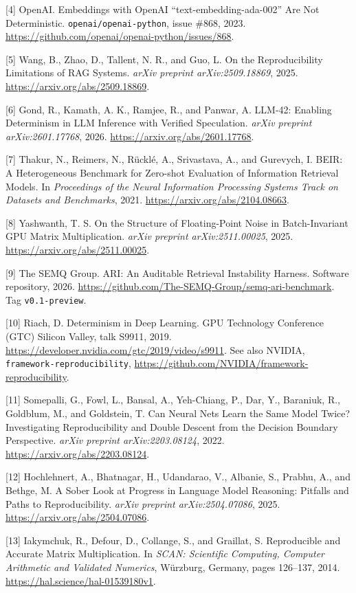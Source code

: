 \documentclass{article}
\begin{document}
[4] OpenAI.
Embeddings with OpenAI ``text-embedding-ada-002'' Are Not Deterministic.
\texttt{openai/openai-python}, issue \#868, 2023.
\url{https://github.com/openai/openai-python/issues/868}.

[5] Wang, B., Zhao, D., Tallent, N. R., and Guo, L.
On the Reproducibility Limitations of RAG Systems.
\emph{arXiv preprint arXiv:2509.18869}, 2025.
\url{https://arxiv.org/abs/2509.18869}.

[6] Gond, R., Kamath, A. K., Ramjee, R., and Panwar, A.
LLM-42: Enabling Determinism in LLM Inference with Verified Speculation.
\emph{arXiv preprint arXiv:2601.17768}, 2026.
\url{https://arxiv.org/abs/2601.17768}.

[7] Thakur, N., Reimers, N., R{\"u}ckl{\'e}, A., Srivastava, A., and Gurevych, I.
BEIR: A Heterogeneous Benchmark for Zero-shot Evaluation of Information Retrieval Models.
In \emph{Proceedings of the Neural Information Processing Systems Track on Datasets and Benchmarks}, 2021.
\url{https://arxiv.org/abs/2104.08663}.

[8] Yashwanth, T. S.
On the Structure of Floating-Point Noise in Batch-Invariant GPU
Matrix Multiplication.
\emph{arXiv preprint arXiv:2511.00025}, 2025.
\url{https://arxiv.org/abs/2511.00025}.


[9] The SEMQ Group.
ARI: An Auditable Retrieval Instability Harness.
Software repository, 2026.
\url{https://github.com/The-SEMQ-Group/semq-ari-benchmark}.
Tag \texttt{v0.1-preview}.

[10] Riach, D.
Determinism in Deep Learning.
GPU Technology Conference (GTC) Silicon Valley, talk S9911, 2019.
\url{https://developer.nvidia.com/gtc/2019/video/s9911}.
See also NVIDIA, \texttt{framework-reproducibility},
\url{https://github.com/NVIDIA/framework-reproducibility}.

[11] Somepalli, G., Fowl, L., Bansal, A., Yeh-Chiang, P., Dar, Y.,
Baraniuk, R., Goldblum, M., and Goldstein, T.
Can Neural Nets Learn the Same Model Twice? Investigating Reproducibility
and Double Descent from the Decision Boundary Perspective.
\emph{arXiv preprint arXiv:2203.08124}, 2022.
\url{https://arxiv.org/abs/2203.08124}.

[12] Hochlehnert, A., Bhatnagar, H., Udandarao, V., Albanie, S.,
Prabhu, A., and Bethge, M.
A Sober Look at Progress in Language Model Reasoning: Pitfalls and Paths
to Reproducibility.
\emph{arXiv preprint arXiv:2504.07086}, 2025.
\url{https://arxiv.org/abs/2504.07086}.

[13] Iakymchuk, R., Defour, D., Collange, S., and Graillat, S.
Reproducible and Accurate Matrix Multiplication.
In \emph{SCAN: Scientific Computing, Computer Arithmetic and Validated
Numerics}, W\"urzburg, Germany, pages 126--137, 2014.
\url{https://hal.science/hal-01539180v1}.
\end{document}
